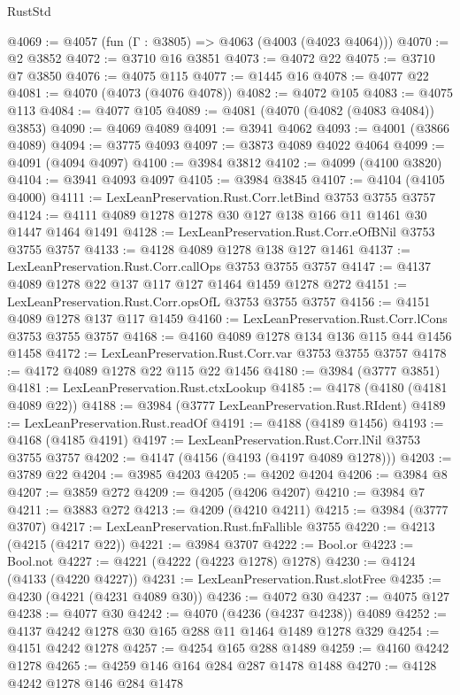 \begin{lexlean}{RustStd}
\begin{coremodule}
{\begin{coremodule}
{{{{{{{{{{{{{{{{{{{{{{{{{{{{{{{@4069 := @4057 (fun (Γ : @3805) => @4063 (@4003 (@4023 @4064)))
@4070 := @2 @3852
@4072 := @3710 @16 @3851
@4073 := @4072 @22
@4075 := @3710 @7 @3850
@4076 := @4075 @115
@4077 := @1445 @16
@4078 := @4077 @22
@4081 := @4070 (@4073 (@4076 @4078))
@4082 := @4072 @105
@4083 := @4075 @113
@4084 := @4077 @105
@4089 := @4081 (@4070 (@4082 (@4083 @4084)) @3853)
@4090 := @4069 @4089
@4091 := @3941 @4062
@4093 := @4001 (@3866 @4089)
@4094 := @3775 @4093
@4097 := @3873 @4089 @4022 @4064
@4099 := @4091 (@4094 @4097)
@4100 := @3984 @3812
@4102 := @4099 (@4100 @3820)
@4104 := @3941 @4093 @4097
@4105 := @3984 @3845
@4107 := @4104 (@4105 @4000)
@4111 := LexLeanPreservation.Rust.Corr.letBind @3753 @3755 @3757
@4124 := @4111 @4089 @1278 @1278 @30 @127 @138 @166 @11 @1461 @30 @1447 @1464 @1491
@4128 := LexLeanPreservation.Rust.Corr.eOfBNil @3753 @3755 @3757
@4133 := @4128 @4089 @1278 @138 @127 @1461
@4137 := LexLeanPreservation.Rust.Corr.callOps @3753 @3755 @3757
@4147 := @4137 @4089 @1278 @22 @137 @117 @127 @1464 @1459 @1278 @272
@4151 := LexLeanPreservation.Rust.Corr.opsOfL @3753 @3755 @3757
@4156 := @4151 @4089 @1278 @137 @117 @1459
@4160 := LexLeanPreservation.Rust.Corr.lCons @3753 @3755 @3757
@4168 := @4160 @4089 @1278 @134 @136 @115 @44 @1456 @1458
@4172 := LexLeanPreservation.Rust.Corr.var @3753 @3755 @3757
@4178 := @4172 @4089 @1278 @22 @115 @22 @1456
@4180 := @3984 (@3777 @3851)
@4181 := LexLeanPreservation.Rust.ctxLookup
@4185 := @4178 (@4180 (@4181 @4089 @22))
@4188 := @3984 (@3777 LexLeanPreservation.Rust.RIdent)
@4189 := LexLeanPreservation.Rust.readOf
@4191 := @4188 (@4189 @1456)
@4193 := @4168 (@4185 @4191)
@4197 := LexLeanPreservation.Rust.Corr.lNil @3753 @3755 @3757
@4202 := @4147 (@4156 (@4193 (@4197 @4089 @1278)))
@4203 := @3789 @22
@4204 := @3985 @4203
@4205 := @4202 @4204
@4206 := @3984 @8
@4207 := @3859 @272
@4209 := @4205 (@4206 @4207)
@4210 := @3984 @7
@4211 := @3883 @272
@4213 := @4209 (@4210 @4211)
@4215 := @3984 (@3777 @3707)
@4217 := LexLeanPreservation.Rust.fnFallible @3755
@4220 := @4213 (@4215 (@4217 @22))
@4221 := @3984 @3707
@4222 := Bool.or
@4223 := Bool.not
@4227 := @4221 (@4222 (@4223 @1278) @1278)
@4230 := @4124 (@4133 (@4220 @4227))
@4231 := LexLeanPreservation.Rust.slotFree
@4235 := @4230 (@4221 (@4231 @4089 @30))
@4236 := @4072 @30
@4237 := @4075 @127
@4238 := @4077 @30
@4242 := @4070 (@4236 (@4237 @4238)) @4089
@4252 := @4137 @4242 @1278 @30 @165 @288 @11 @1464 @1489 @1278 @329
@4254 := @4151 @4242 @1278
@4257 := @4254 @165 @288 @1489
@4259 := @4160 @4242 @1278
@4265 := @4259 @146 @164 @284 @287 @1478 @1488
@4270 := @4128 @4242 @1278 @146 @284 @1478
}}}}}}}}}}}}}}}}}}}}}}}}}}}}}}}
\end{coremodule}}
\end{coremodule}
\end{lexlean}
